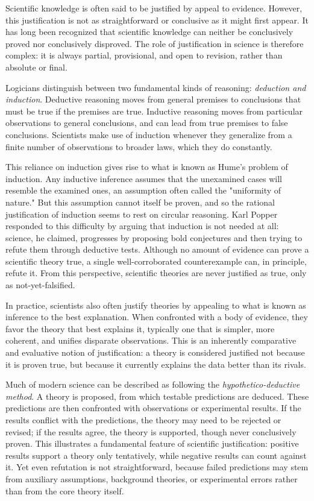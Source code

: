 Scientific knowledge is often said to be justified by appeal to evidence. However, this justification is not as straightforward or conclusive as it might first appear. It has long been recognized that scientific knowledge can neither be conclusively proved nor conclusively disproved. The role of justification in science is therefore complex: it is always partial, provisional, and open to revision, rather than absolute or final.

Logicians distinguish between two fundamental kinds of reasoning: \emph{deduction and induction}. Deductive reasoning moves from general premises to conclusions that must be true if the premises are true. Inductive reasoning moves from particular observations to general conclusions, and can lead from true premises to false conclusions. Scientists make use of induction whenever they generalize from a finite number of observations to broader laws, which they do constantly.

This reliance on induction gives rise to what is known as Hume's problem of induction. Any inductive inference assumes that the unexamined cases will resemble the examined ones, an assumption often called the "uniformity of nature." But this assumption cannot itself be proven, and so the rational justification of induction seems to rest on circular reasoning. Karl Popper responded to this difficulty by arguing that induction is not needed at all: science, he claimed, progresses by proposing bold conjectures and then trying to refute them through deductive tests. Although no amount of evidence can prove a scientific theory true, a single well-corroborated counterexample can, in principle, refute it. From this perspective, scientific theories are never justified as true, only as not-yet-falsified.

In practice, scientists also often justify theories by appealing to what is known as inference to the best explanation. When confronted with a body of evidence, they favor the theory that best explains it, typically one that is simpler, more coherent, and unifies disparate observations. This is an inherently comparative and evaluative notion of justification: a theory is considered justified not because it is proven true, but because it currently explains the data better than its rivals.

Much of modern science can be described as following the \emph{hypothetico-deductive method}. A theory is proposed, from which testable predictions are deduced. These predictions are then confronted with observations or experimental results. If the results conflict with the predictions, the theory may need to be rejected or revised; if the results agree, the theory is supported, though never conclusively proven. This illustrates a fundamental feature of scientific justification: positive results support a theory only tentatively, while negative results can count against it. Yet even refutation is not straightforward, because failed predictions may stem from auxiliary assumptions, background theories, or experimental errors rather than from the core theory itself.

